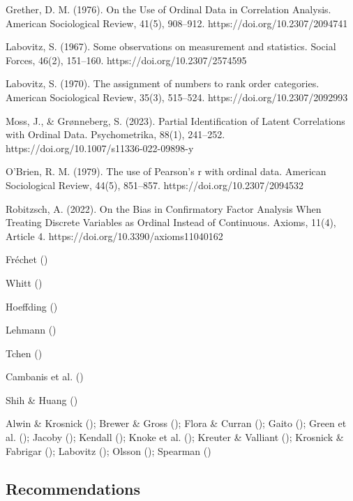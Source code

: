 \documentclass[
  12pt,
]{article}
\theoremstyle{plain}
\theoremstyle{definition}
\theoremstyle{remark}
\begin{document}
Grether, D. M. (1976). On the Use of Ordinal Data in Correlation
Analysis. American Sociological Review, 41(5), 908--912.
https://doi.org/10.2307/2094741

Labovitz, S. (1967). Some observations on measurement and statistics.
Social Forces, 46(2), 151--160. https://doi.org/10.2307/2574595

Labovitz, S. (1970). The assignment of numbers to rank order categories.
American Sociological Review, 35(3), 515--524.
https://doi.org/10.2307/2092993

Moss, J., \& Grønneberg, S. (2023). Partial Identification of Latent
Correlations with Ordinal Data. Psychometrika, 88(1), 241--252.
https://doi.org/10.1007/s11336-022-09898-y

O'Brien, R. M. (1979). The use of Pearson's r with ordinal data.
American Sociological Review, 44(5), 851--857.
https://doi.org/10.2307/2094532

Robitzsch, A. (2022). On the Bias in Confirmatory Factor Analysis When
Treating Discrete Variables as Ordinal Instead of Continuous. Axioms,
11(4), Article 4. https://doi.org/10.3390/axioms11040162

Fréchet ()

Whitt ()

Hoeffding ()

Lehmann ()

Tchen ()

Cambanis et al. ()

Shih \& Huang ()

Alwin \& Krosnick (); Brewer \&
Gross (); Flora \& Curran
(); Gaito
(); Green et al.
(); Jacoby
(); Kendall
(); Knoke et al.
(); Kreuter \& Valliant
(); Krosnick \& Fabrigar
(); Labovitz
(); Olsson
(); Spearman
()

\subsection{Recommendations}\label{recommendations}
\end{document}
